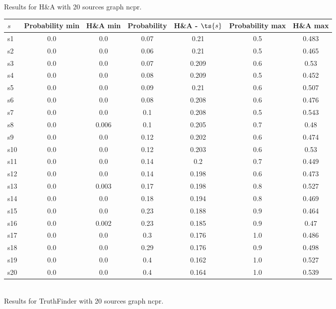 \documentclass{article}
\begin{document}
\noindent Results for H\&A with 20 sources graph ncpr.

\noindent\begin{tabular}{|l|c|c|c|c|c|c|}
\hline
$s$& Probability min & H\&A min & Probability & H\&A - $\ts{s}$ & Probability max & H\&A max\\
\hline
s1 &0.0 & 0.0 & 0.07 & 0.21 & 0.5 & 0.483\\
\hline
s2 &0.0 & 0.0 & 0.06 & 0.21 & 0.5 & 0.465\\
\hline
s3 &0.0 & 0.0 & 0.07 & 0.209 & 0.6 & 0.53\\
\hline
s4 &0.0 & 0.0 & 0.08 & 0.209 & 0.5 & 0.452\\
\hline
s5 &0.0 & 0.0 & 0.09 & 0.21 & 0.6 & 0.507\\
\hline
s6 &0.0 & 0.0 & 0.08 & 0.208 & 0.6 & 0.476\\
\hline
s7 &0.0 & 0.0 & 0.1 & 0.208 & 0.5 & 0.543\\
\hline
s8 &0.0 & 0.006 & 0.1 & 0.205 & 0.7 & 0.48\\
\hline
s9 &0.0 & 0.0 & 0.12 & 0.202 & 0.6 & 0.474\\
\hline
s10 &0.0 & 0.0 & 0.12 & 0.203 & 0.6 & 0.53\\
\hline
s11 &0.0 & 0.0 & 0.14 & 0.2 & 0.7 & 0.449\\
\hline
s12 &0.0 & 0.0 & 0.14 & 0.198 & 0.6 & 0.473\\
\hline
s13 &0.0 & 0.003 & 0.17 & 0.198 & 0.8 & 0.527\\
\hline
s14 &0.0 & 0.0 & 0.18 & 0.194 & 0.8 & 0.469\\
\hline
s15 &0.0 & 0.0 & 0.23 & 0.188 & 0.9 & 0.464\\
\hline
s16 &0.0 & 0.002 & 0.23 & 0.185 & 0.9 & 0.47\\
\hline
s17 &0.0 & 0.0 & 0.3 & 0.176 & 1.0 & 0.486\\
\hline
s18 &0.0 & 0.0 & 0.29 & 0.176 & 0.9 & 0.498\\
\hline
s19 &0.0 & 0.0 & 0.4 & 0.162 & 1.0 & 0.527\\
\hline
s20 &0.0 & 0.0 & 0.4 & 0.164 & 1.0 & 0.539\\
\hline
\end{tabular}\\

\noindent Results for TruthFinder with 20 sources graph ncpr.
\end{document}
